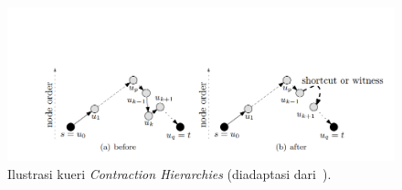 \begin{figure}[H]
    \centering
    \includegraphics[width=\linewidth, keepaspectratio]{figures/CH.png}
    \caption{Ilustrasi kueri \textit{Contraction Hierarchies} (diadaptasi dari~\cite{Geisberger2012}).}
    \label{fig:query-ch}
\end{figure}



